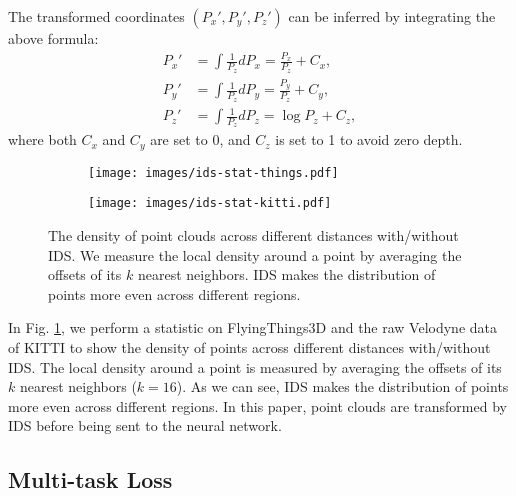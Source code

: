 \documentclass[10pt,twocolumn,letterpaper]{article}
\begin{document}
The transformed coordinates $(P_x', P_y', P_z')$ can be inferred by integrating the above formula:
\begin{align}
    \label{eq:ids_x}
    P_x' &= \int \frac{1}{P_z} dP_x = \frac{P_x}{P_z} + C_x, \\
    \label{eq:ids_y}
    P_y' &= \int \frac{1}{P_z} dP_y = \frac{P_y}{P_z} + C_y, \\
    \label{eq:ids_z}
    P_z' &= \int \frac{1}{P_z} dP_z = \log{P_z} + C_z,
\end{align}
where both $C_x$ and $C_y$ are set to 0, and $C_z$ is set to 1 to avoid zero depth.

\begin{figure}[t]
    \vspace{-5pt}
    \centering
    \begin{subfigure}[b]{0.5\linewidth}
        \texttt{[image: images/ids-stat-things.pdf]}\end{subfigure}\hfill
    \begin{subfigure}[b]{0.5\linewidth}
        \texttt{[image: images/ids-stat-kitti.pdf]}\end{subfigure}\vspace{-10pt}
    \caption{The density of point clouds across different distances with/without IDS. We measure the local density around a point by averaging the offsets of its $k$ nearest neighbors. IDS makes the distribution of points more even across different regions.}
    \vspace{-10pt}
    \label{fig:ids-stat}
\end{figure}

In Fig. \ref{fig:ids-stat}, we perform a statistic on FlyingThings3D and the raw Velodyne data of KITTI to show the density of points across different distances with/without IDS. The local density around a point is measured by averaging the offsets of its $k$ nearest neighbors ($k=16$). As we can see, IDS makes the distribution of points more even across different regions. In this paper, point clouds are transformed by IDS before being sent to the neural network. 

\subsection{Multi-task Loss}
\end{document}
